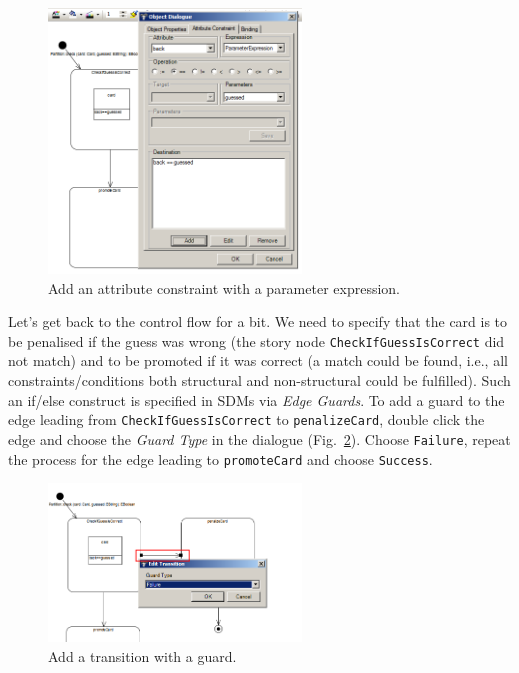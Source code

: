 \clearpage
\begin{figure}[!htbp] 
\begin{center}
  \includegraphics[width=0.6\textwidth]{pics/sdmBilder/check/sdm18RAW}
  \caption{Add an attribute constraint with a parameter expression.}  
  \label{fig:sdm_check_att_constraint}
\end{center}
\end{figure} 

Let's get back to the control flow for a bit.  We need to specify that the card
is to be penalised if the guess was wrong (the story node
\texttt{Check\-If\-Guess\-Is\-Correct} did not match) and to be promoted if it
was correct (a match could be found, i.e., all constraints/conditions both
structural and non-structural could be fulfilled).  Such an if/else construct is
specified in SDMs via \emph{Edge Guards}.  To add a guard to the edge leading
from \texttt{Check\-If\-Guess\-Is\-Correct} to \texttt{penalize\-Card}, double
click the edge and choose the \emph{Guard Type} in the dialogue
(Fig.~\ref{fig:sdm_check_guard}).  Choose \texttt{Failure}, repeat the process
for the edge leading to \texttt{promoteCard} and choose \texttt{Success}.

\begin{figure}[!htbp]
\begin{center}
  \includegraphics[width=0.6\textwidth]{pics/sdmBilder/check/sdm19}
  \caption{Add a transition with a guard.}  
  \label{fig:sdm_check_guard}
\end{center}
\end{figure}

